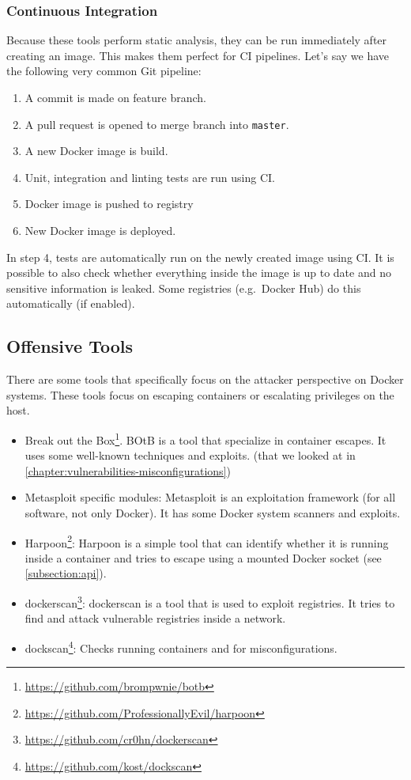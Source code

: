 \subsubsection{Continuous Integration}
Because these tools perform static analysis, they can be run immediately after creating an image. This makes them perfect for CI pipelines. Let's say we have the following very common Git pipeline:
\begin{enumerate}
    \item A commit is made on feature branch.
    \item A pull request is opened to merge branch into \lstinline{master}.
    \item A new Docker image is build.
    \item Unit, integration and linting tests are run using CI\@.
    \item Docker image is pushed to registry
    \item New Docker image is deployed.
\end{enumerate}

In step 4, tests are automatically run on the newly created image using CI\@. It is possible to also check whether everything inside the image is up to date and no sensitive information is leaked. Some registries (e.g.\ Docker Hub) do this automatically (if enabled).

\subsection{Offensive Tools}\label{subsection:offensive-tools}
There are some tools that specifically focus on the attacker perspective on Docker systems. These tools focus on escaping containers or escalating privileges on the host.

\begin{itemize}
    \item Break out the Box\footnote{\url{https://github.com/brompwnie/botb}}. BOtB is a tool that specialize in container escapes. It uses some well-known techniques and exploits. (that we looked at in \autoref{chapter:vulnerabilities-misconfigurations})
    \item Metasploit specific modules: Metasploit is an exploitation framework (for all software, not only Docker). It has some Docker system scanners and exploits\cite{Docker-Credentials-Metasploit}\cite{Metasploit-Linux-Gather-Container-Detection}\cite{Metasploit-Unprotected-TCP-Socket}.
    \item Harpoon\footnote{\url{https://github.com/ProfessionallyEvil/harpoon}}: Harpoon is a simple tool that can identify whether it is running inside a container and tries to escape using a mounted Docker socket (see \autoref{subsection:api}).
    \item dockerscan\footnote{\url{https://github.com/cr0hn/dockerscan}}: dockerscan is a tool that is used to exploit registries. It tries to find and attack vulnerable registries inside a network.
    \item dockscan\footnote{\url{https://github.com/kost/dockscan}}: Checks running containers and for misconfigurations.
\end{itemize}

